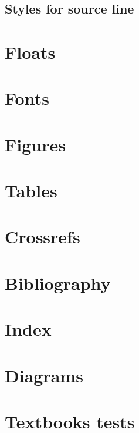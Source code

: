 \documentclass[output=book
	      ,nonflat
	      ,modfonts,
	      ,colorlinks
	      ,biblatex
	      ,showindex
	      ]{langsci/langscibook}
\begin{document}
\subsection{Styles for source line}




\section{Floats}
 
 

\section{Fonts}

%  
\section{Figures}\label{sec:tables}

\section{Tables}\label{sec:tables}

\section{Crossrefs}

\section{Bibliography}
 
\section{Index}
 
\section{Diagrams}
 

%  
 
%  
%  
\section{Textbooks tests}
 
 
 

\end{document}
